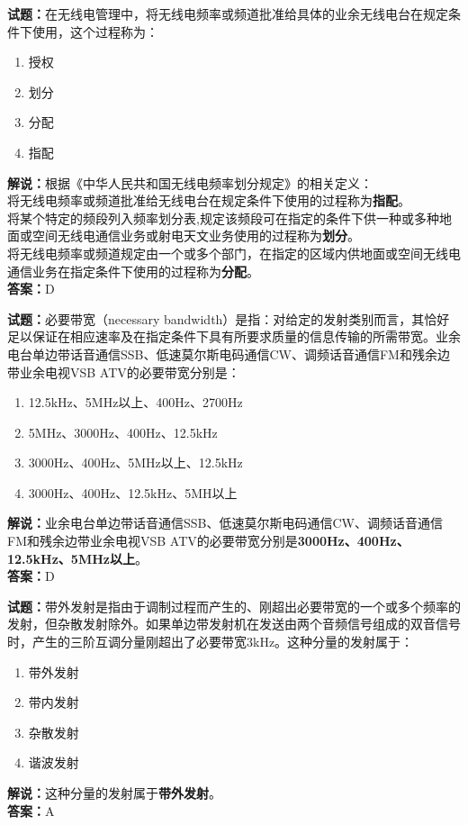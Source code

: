 \documentclass{ctexbook}
\begin{document}
\bigskip

\noindent\textbf{试题：}在无线电管理中，将无线电频率或频道批准给具体的业余无线电台在规定条件下使用，这个过程称为：
\begin{enumerate}[leftmargin=3em]
  \item 授权
  \item 划分
  \item 分配
  \item 指配
\end{enumerate}
\noindent\textbf{解说：}根据《中华人民共和国无线电频率划分规定》的相关定义：\\将无线电频率或频道批准给无线电台在规定条件下使用的过程称为\textbf{指配}。\\将某个特定的频段列入频率划分表,规定该频段可在指定的条件下供一种或多种地面或空间无线电通信业务或射电天文业务使用的过程称为\textbf{划分}。\\将无线电频率或频道规定由一个或多个部门，在指定的区域内供地面或空间无线电通信业务在指定条件下使用的过程称为\textbf{分配}。\\
\textbf{答案：}D

\bigskip

\noindent\textbf{试题：}必要带宽（necessary bandwidth）是指：对给定的发射类别而言，其恰好足以保证在相应速率及在指定条件下具有所要求质量的信息传输的所需带宽。业余电台单边带话音通信SSB、低速莫尔斯电码通信CW、调频话音通信FM和残余边带业余电视VSB ATV的必要带宽分别是：
\begin{enumerate}[leftmargin=3em]
  \item 12.5\unit{\kHz}、5\unit{\MHz}以上、400Hz、2700Hz
  \item 5\unit{\MHz}、3000Hz、400Hz、12.5\unit{\kHz}
  \item 3000Hz、400Hz、5\unit{\MHz}以上、12.5\unit{\kHz}
  \item 3000Hz、400Hz、12.5\unit{\kHz}、5MH以上
\end{enumerate}
\noindent\textbf{解说：}业余电台单边带话音通信SSB、低速莫尔斯电码通信CW、调频话音通信FM和残余边带业余电视VSB ATV的必要带宽分别是\textbf{3000Hz、400Hz、12.5\unit{\kHz}、5\unit{\MHz}以上}。\\\noindent\textbf{答案：}D

\bigskip

\noindent\textbf{试题：}带外发射是指由于调制过程而产生的、刚超出必要带宽的一个或多个频率的发射，但杂散发射除外。如果单边带发射机在发送由两个音频信号组成的双音信号时，产生的三阶互调分量刚超出了必要带宽3\unit{\kHz}。这种分量的发射属于：
\begin{enumerate}[leftmargin=3em]
  \item 带外发射
  \item 带内发射
  \item 杂散发射
  \item 谐波发射
\end{enumerate}
\noindent\textbf{解说：}这种分量的发射属于\textbf{带外发射}。\\\noindent\textbf{答案：}A
\end{document}
